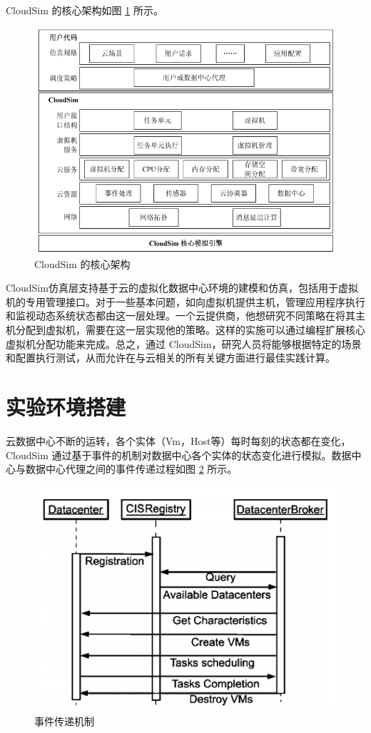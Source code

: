 CloudSim 的核心架构如图 \ref{Fig:chap4_1} 所示。

\begin{figure}[htbp]
  \centering
  \includegraphics{./Figure/IMG_Chap4_1.png}
  \caption{CloudSim 的核心架构}\label{Fig:chap4_1}
\end{figure}

 CloudSim仿真层支持基于云的虚拟化数据中心环境的建模和仿真，包括用于虚拟机的专用管理接口。对于一些基本问题，如向虚拟机提供主机，管理应用程序执行和监视动态系统状态都由这一层处理。一个云提供商，他想研究不同策略在将其主机分配到虚拟机，需要在这一层实现他的策略。这样的实施可以通过编程扩展核心虚拟机分配功能来完成。总之，通过 CloudSim，研究人员将能够根据特定的场景和配置执行测试，从而允许在与云相关的所有关键方面进行最佳实践计算。

 \section{实验环境搭建}
云数据中心不断的运转，各个实体（Vm，Host等）每时每刻的状态都在变化，CloudSim 通过基于事件的机制对数据中心各个实体的状态变化进行模拟。数据中心与数据中心代理之间的事件传递过程如图 \ref{Fig:chap4_2} 所示。

\begin{figure}[htbp]
  \centering
  \includegraphics{./Figure/IMG_Chap4_2.png}
  \caption{事件传递机制}\label{Fig:chap4_2}
\end{figure}

